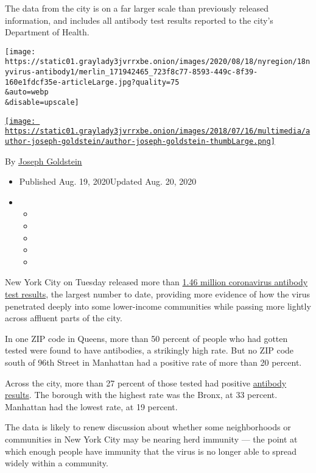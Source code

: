 The data from the city is on a far larger scale than previously released
information, and includes all antibody test results reported to the
city's Department of Health.

\texttt{[image: https://static01.graylady3jvrrxbe.onion/images/2020/08/18/nyregion/18nyvirus-antibody1/merlin\_171942465\_723f8c77-8593-449c-8f39-160e1fdcf35e-articleLarge.jpg?quality=75\\\&auto=webp\\\&disable=upscale]}

\href{https://www.nytimes3xbfgragh.onion/by/joseph-goldstein}{\texttt{[image: https://static01.graylady3jvrrxbe.onion/images/2018/07/16/multimedia/author-joseph-goldstein/author-joseph-goldstein-thumbLarge.png]}}

By \href{https://www.nytimes3xbfgragh.onion/by/joseph-goldstein}{Joseph
Goldstein}

\begin{itemize}
\item
  Published Aug. 19, 2020Updated Aug. 20, 2020
\item
  \begin{itemize}
  \item
  \item
  \item
  \item
  \item
  \end{itemize}
\end{itemize}

New York City on Tuesday released more than
\href{https://www1.nyc.gov/site/doh/covid/covid-19-data-testing.page}{1.46
million coronavirus antibody test results}, the largest number to date,
providing more evidence of how the virus penetrated deeply into some
lower-income communities while passing more lightly across affluent
parts of the city.

In one ZIP code in Queens, more than 50 percent of people who had gotten
tested were found to have antibodies, a strikingly high rate. But no ZIP
code south of 96th Street in Manhattan had a positive rate of more than
20 percent.

Across the city, more than 27 percent of those tested had positive
\href{https://www.nytimes3xbfgragh.onion/2020/08/20/nyregion/nyc-coronavirus-antibody-testing.html}{antibody
results}. The borough with the highest rate was the Bronx, at 33
percent. Manhattan had the lowest rate, at 19 percent.

The data is likely to renew discussion about whether some neighborhoods
or communities in New York City may be nearing herd immunity --- the
point at which enough people have immunity that the virus is no longer
able to spread widely within a community.

